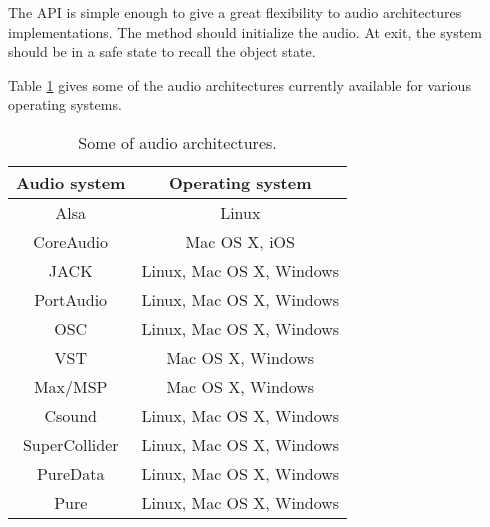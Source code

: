 The API is simple enough to give a great flexibility to audio architectures implementations. The  method should initialize the audio. At  exit, the system should be in a safe state to recall the  object state.

Table \ref{tab:aarch} gives some of the audio architectures currently available for various operating systems.
\begin{table}[htp]
\begin{center}
\begin{tabular}{|c|c|}
\hline
\bf{Audio system} & \bf{Operating system} \\
\hline
Alsa  & Linux \\
CoreAudio 		& Mac OS X, iOS \\
JACK 			& Linux, Mac OS X, Windows \\
PortAudio 			& Linux, Mac OS X, Windows \\
OSC				& Linux, Mac OS X, Windows \\
VST				& Mac OS X, Windows \\
Max/MSP			& Mac OS X, Windows \\
Csound			& Linux, Mac OS X, Windows \\
SuperCollider		& Linux, Mac OS X, Windows \\
PureData			& Linux, Mac OS X, Windows \\
Pure 			& Linux, Mac OS X, Windows \\
\hline
\end{tabular}
\end{center}
\caption{Some of \faust audio architectures.}
\label{tab:aarch}
\end{table}%
 

